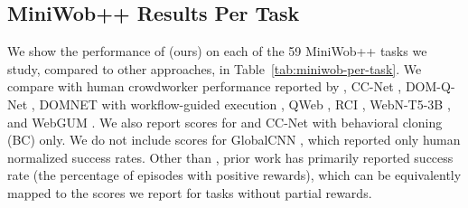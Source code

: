 \subsection{MiniWob++ Results Per Task}

We show the performance of \ours (ours) on each of the 59 MiniWob++ tasks we study, compared to other approaches, in Table~\ref{tab:miniwob-per-task}. We compare with human crowdworker performance reported by \citet{humphreys2022data}, CC-Net \citep{humphreys2022data}, DOM-Q-Net \citep{jia2019dom}, DOMNET with workflow-guided execution \citep{liu2018reinforcement}, QWeb \citep{gur2018learning}, RCI \citep{kim2023language}, WebN-T5-3B \citep{gur2022understanding}, and WebGUM \citep{furuta2023instruction}. We also report scores for \ours and CC-Net with behavioral cloning (BC) only. We do not include scores for GlobalCNN \citep{shi2017world}, which reported only human normalized success rates. Other than \citet{humphreys2022data}, prior work has primarily reported success rate (\ie the percentage of episodes with positive rewards), which can be equivalently mapped to the scores we report for tasks without partial rewards.



